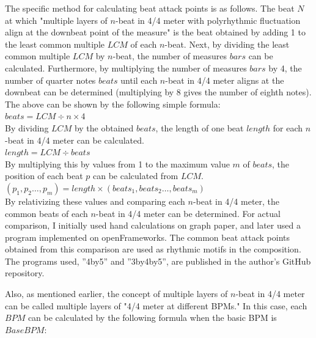 The specific method for calculating beat attack points is as follows. The beat $ N $ at which "multiple layers of $ n $-beat in 4/4 meter with polyrhythmic fluctuation align at the downbeat point of the measure" is the beat obtained by adding 1 to the least common multiple $ LCM $ of each $ n $-beat. Next, by dividing the least common multiple $ LCM $ by $ n $-beat, the number of measures $ bars $ can be calculated. Furthermore, by multiplying the number of measures $ bars $ by 4, the number of quarter notes $ beats $ until each $ n $-beat in 4/4 meter aligns at the downbeat can be determined (multiplying by 8 gives the number of eighth notes). The above can be shown by the following simple formula:\\

\begin{math}
beats = LCM \div n \times 4
\end{math}\\

By dividing $ LCM $ by the obtained $ beats $, the length of one beat $ length $ for each $ n $-beat in 4/4 meter can be calculated.\\

\begin{math}
length = LCM \div beats
\end{math}\\

By multiplying this by values from 1 to the maximum value $ m $ of $ beats $, the position of each beat $ p $ can be calculated from $ LCM $.\\

\begin{math}
(p_1,p_2\dots,p_m) = length \times (beats_1,beats_2\dots,beats_m)
\end{math}\\

By relativizing these values and comparing each $ n $-beat in 4/4 meter, the common beats of each $ n $-beat in 4/4 meter can be determined. For actual comparison, I initially used hand calculations on graph paper, and later used a program implemented on openFrameworks. The common beat attack points obtained from this comparison are used as rhythmic motifs in the composition. The programs used, ''4by5''\cite{yamato:02} and ''3by4by5''\cite{yamato:03}, are published in the author's GitHub repository.

Also, as mentioned earlier, the concept of multiple layers of $ n $-beat in 4/4 meter can be called multiple layers of "4/4 meter at different BPMs." In this case, each $ BPM $ can be calculated by the following formula when the basic BPM is $ BaseBPM $:\\

